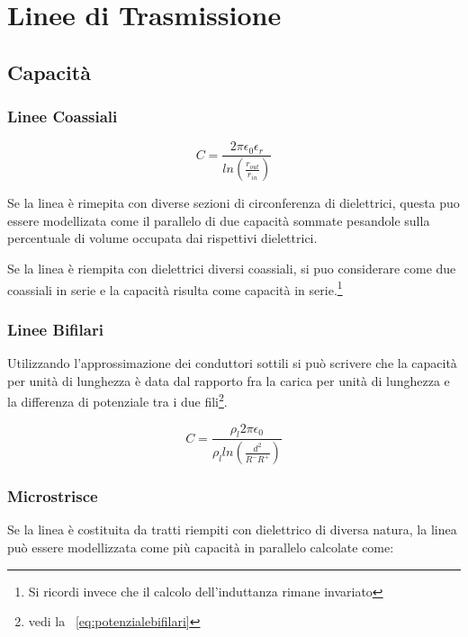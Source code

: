 
\chapter{Linee di Trasmissione}

	\section{Capacità}

	
		\subsection{Linee Coassiali}
				\begin{equation}
				C=\frac{2\pi \epsilon_0 \epsilon_r} {ln (\frac { r_{out}} {r_{in} } )}
				\end{equation}

				Se la linea è rimepita con diverse sezioni di circonferenza di dielettrici, questa puo essere modellizata come il parallelo di due capacità sommate pesandole sulla percentuale di volume occupata dai rispettivi dielettrici.
			
				Se la linea è riempita con dielettrici diversi coassiali, si puo considerare come due coassiali in serie e la capacità risulta come capacità in serie.\footnote{Si ricordi invece che il calcolo dell'induttanza rimane invariato}


		\subsection{Linee Bifilari}

			Utilizzando l'approssimazione dei conduttori sottili si può scrivere che la capacità per unità di lunghezza è data dal rapporto fra la carica per unità di lunghezza e la 
			differenza di potenziale tra i due fili\footnote{vedi la ~\ref{eq:potenzialebifilari}}.
			

			\begin{equation}
			C=\frac{\rho_l 2 \pi \epsilon_0}{\rho_l ln(\frac{d^2}{R^-R^+})}
			\label{eq:capacitabifilare}
			\end{equation}



		\subsection{Microstrisce}

	

	 		Se la linea è costituita da tratti riempiti con dielettrico di diversa natura, la linea può essere modellizzata come più capacità in parallelo calcolate come:

